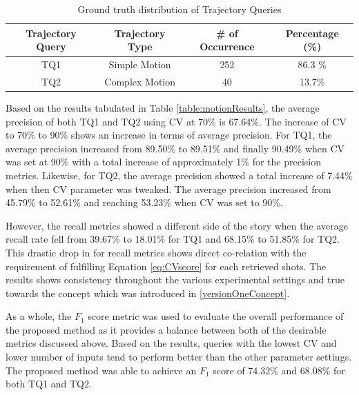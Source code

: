 \begin{table}[bht!]
\centering
\caption{Ground truth distribution of Trajectory Queries}
\label{table:motiondist}
\begin{tabular}{cccc}
\toprule
Trajectory Query &  Trajectory Type & \# of Occurrence & Percentage (\%)   \\
\midrule
TQ1       & Simple Motion       & 252 & 86.3 \%  \\
TQ2      & Complex Motion       & 40 & 13.7\%  \\
\bottomrule
\end{tabular}
\end{table}

Based on the results tabulated in Table \ref{table:motionResults}, the average precision of both TQ1 and TQ2 using CV at 70\% is 67.64\%. The increase of CV to 70\% to 90\% shows an increase in terms of average precision. For TQ1, the average precision increased from 89.50\% to 89.51\% and finally 90.49\% when CV was set at 90\% with a total increase of approximately 1\% for the precision metrics. Likewise, for TQ2, the average precision showed a total increase of 7.44\% when then CV parameter was tweaked. The average precision increased from 45.79\% to 52.61\% and reaching 53.23\% when CV was set to 90\%. 

However, the recall metrics showed a different side of the story when the average recall rate fell from 39.67\% to 18.01\% for TQ1 and 68.15\% to 51.85\% for TQ2. This drastic drop in for recall metrics shows direct co-relation with the requirement of fulfilling Equation \ref{eq:CVscore} for each retrieved shots. The results shows consistency throughout the various experimental settings and true towards the concept which was introduced in \ref{versionOneConcept}.  

As a whole, the $F_1$ score metric was used to evaluate the overall performance of the proposed method as it provides a balance between both of the desirable metrics discussed above. Based on the results, queries with the lowest CV and lower number of inputs tend to perform better than the other parameter settings. The proposed method was able to achieve an $F_1$ score of 74.32\% and 68.08\% for both TQ1 and TQ2. 


